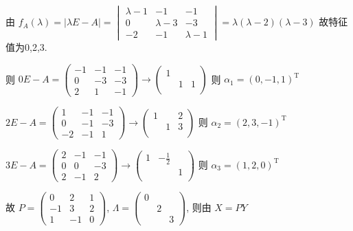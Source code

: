 \begin{enumerate}
			       由 \( f_{A}(\lambda) = |\lambda E - A| = \begin{vmatrix}
				       \lambda-1 & -1        & -1        \\
				       0         & \lambda-3 & -3        \\
				       -2        & -1        & \lambda-1
			       \end{vmatrix} = \lambda(\lambda-2)(\lambda-3) \) 故特征值为0,2,3.

			       则 \( 0E-A = \begin{pmatrix}
				       -1 & -1 & -1 \\
				       0  & -3 & -3 \\
				       2  & 1  & -1
			       \end{pmatrix} \rightarrow \begin{pmatrix}
				       1 &   &   \\
				         & 1 & 1 \\
				         &   &
			       \end{pmatrix} \) 则 \( \alpha_{1} = (0, -1, 1)^{\mathrm{T}} \)

			       \( 2E-A = \begin{pmatrix}
				       1  & -1 & -1 \\
				       0  & -1 & -3 \\
				       -2 & -1 & 1
			       \end{pmatrix} \rightarrow \begin{pmatrix}
				       1 &   & 2 \\
				         & 1 & 3 \\
				         &   &
			       \end{pmatrix} \) 则 \( \alpha_{2} = (2, 3, -1)^{\mathrm{T}} \)

			       \( 3E-A = \begin{pmatrix}
				       2 & -1 & -1 \\
				       0 & 0  & -3 \\
				       2 & -1 & 2
			       \end{pmatrix} \rightarrow \begin{pmatrix}
				       1 & -\frac{1}{2} &   \\
				         &              & 1 \\
				         &              &
			       \end{pmatrix} \) 则 \( \alpha_{3} = (1, 2, 0)^{\mathrm{T}} \)

			       故 \( P = \begin{pmatrix}
				       0  & 2  & 1 \\
				       -1 & 3  & 2 \\
				       1  & -1 & 0
			       \end{pmatrix} \), \( \Lambda = \begin{pmatrix}
				       0 &   &   \\
				         & 2 &   \\
				         &   & 3
			       \end{pmatrix} \), 则由 \( X = P Y \)


\end{enumerate}
